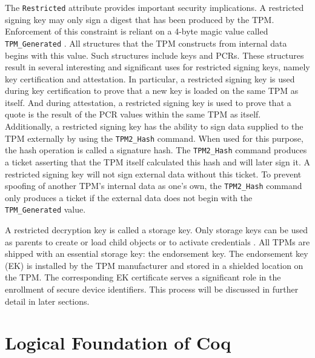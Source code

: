 The \verb|Restricted| attribute provides important security implications. A restricted signing key may only sign a digest that has been produced by the TPM. Enforcement of this constraint is reliant on a 4-byte magic value called \verb|TPM_Generated| \cite{TPMSpec}. All structures that the TPM constructs from internal data begins with this value. Such structures include keys and PCRs. These structures result in several interesting and significant uses for restricted signing keys, namely key certification and attestation. In particular, a restricted signing key is used during key certification to prove that a new key is loaded on the same TPM as itself. And during attestation, a restricted signing key is used to prove that a quote is the result of the PCR values within the same TPM as itself. Additionally, a restricted signing key has the ability to sign data supplied to the TPM externally by using the \verb|TPM2_Hash| command. When used for this purpose, the hash operation is called a signature hash. The \verb|TPM2_Hash| command produces a ticket asserting that the TPM itself calculated this hash and will later sign it. A restricted signing key will not sign external data without this ticket. To prevent spoofing of another TPM's internal data as one's own, the \verb|TPM2_Hash| command only produces a ticket if the external data does not begin with the \verb|TPM_Generated| value.


A restricted decryption key is called a storage key. Only storage keys can be used as parents to create or load child objects or to activate credentials \cite{PracticalGuide}. All TPMs are shipped with an essential storage key: the endorsement key. The endorsement key (EK) is installed by the TPM manufacturer and stored in a shielded location on the TPM. The corresponding EK certificate serves a significant role in the enrollment of secure device identifiers. 
This process will be discussed in further detail in later sections.








\section{Logical Foundation of Coq}



